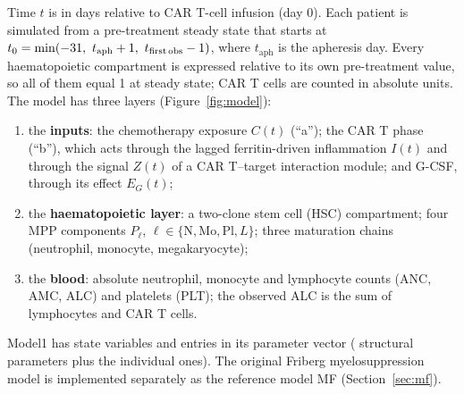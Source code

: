 \documentclass[11pt]{article}
\begin{document}
Time $t$ is in days relative to CAR T-cell infusion (day 0). Each patient is simulated from a pre-treatment steady state that starts at $t_0=\min(\valTmin,\ t_{\mathrm{aph}}+1,\ t_{\mathrm{first\,obs}}-1)$, where $t_{\mathrm{aph}}$ is the apheresis day. Every haematopoietic compartment is expressed relative to its own pre-treatment value, so all of them equal 1 at steady state; CAR T cells are counted in absolute units. The model has three layers (Figure~\ref{fig:model}):
\begin{enumerate}
\item the \textbf{inputs}: the chemotherapy exposure $C(t)$ (``a''); the CAR T phase (``b''), which acts through the lagged ferritin-driven inflammation $I(t)$ and through the signal $Z(t)$ of a CAR T--target interaction module; and G-CSF, through its effect $E_G(t)$;
\item the \textbf{haematopoietic layer}: a two-clone stem cell (HSC) compartment; four MPP components $P_\ell$, $\ell\in\{\mathrm{N},\mathrm{Mo},\mathrm{Pl},L\}$; three maturation chains (neutrophil, monocyte, megakaryocyte);
\item the \textbf{blood}: absolute neutrophil, monocyte and lymphocyte counts (ANC, AMC, ALC) and platelets (PLT); the observed ALC is the sum of lymphocytes and CAR T cells.
\end{enumerate}
Model1 has \valNStates{} state variables and \valNPar{} entries in its parameter vector (\valNStruct{} structural parameters plus the individual ones). The original Friberg myelosuppression model \citep{friberg2002} is implemented separately as the reference model MF (Section~\ref{sec:mf}).
\end{document}
